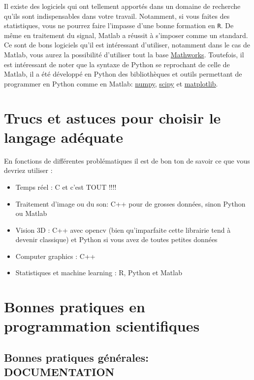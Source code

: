 Il existe des logiciels qui ont tellement apportés dans un domaine de recherche qu'ils sont 
indispensables dans votre travail. Notamment, si vous faites des statistiques, vous ne pourrez
 faire l'impasse d'une bonne formation en \lstinline+R+. De m\^eme en traitement du signal, 
Matlab a réussit à s'imposer comme un standard.\\

Ce sont de bons logiciels qu'il est intéressant d'utiliser, notamment dans le cas de Matlab, 
vous aurez la possibilité d'utiliser tout la base \href{http://www.mathworks.fr/matlabcentral/fileexchange}{Mathworks}.
Toutefois, il est intéressant de noter que la syntaxe de Python se reprochant de celle de Matlab, il a 
été développé en Python des bibliothèques et outils permettant de programmer en Python comme en Matlab: 
\href{http://www.numpy.org/}{numpy}, \href{http://www.scipy.org/}{scipy} et \href{http://matplotlib.org/}{matplotlib}.\\



\section{Trucs et astuces pour choisir le langage adéquate}

En fonctions de différentes problématiques il est de bon ton de savoir ce que vous devriez utiliser :

\begin{itemize}
\item Temps réel : C et c'est TOUT !!!!
\item Traitement d'image ou du son: C++ pour de grosses données, sinon Python ou Matlab
\item Vision 3D : C++ avec opencv (bien qu'imparfaite cette librairie tend à devenir classique) 
et Python si vous avez de toutes petites données
\item Computer graphics : C++ 
\item Statistiques  et machine learning : R, Python et Matlab
\end{itemize}  

\section{Bonnes pratiques en programmation scientifiques}

\subsection{Bonnes pratiques générales: DOCUMENTATION}

